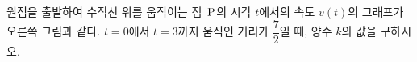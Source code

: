 \noindent\begin{minipage}[t]{0.58\linewidth}\vspace{0pt}\raggedright 원점을 출발하여 수직선 위를 움직이는 점~$\mathrm{P}$의 시각 $t$에서의 속도 $v(t)$의 그래프가 오른쪽 그림과 같다. $t=0$에서 $t=3$까지 움직인 거리가 $\dfrac{7}{2}$일 때, 양수 $k$의 값을 구하시오.\end{minipage}\hfill\begin{minipage}[t]{0.4\linewidth}\vspace{0pt}\centering \resizebox{\ifdim\width>\linewidth\linewidth\else\width\fi}{!}{}\end{minipage}\par
